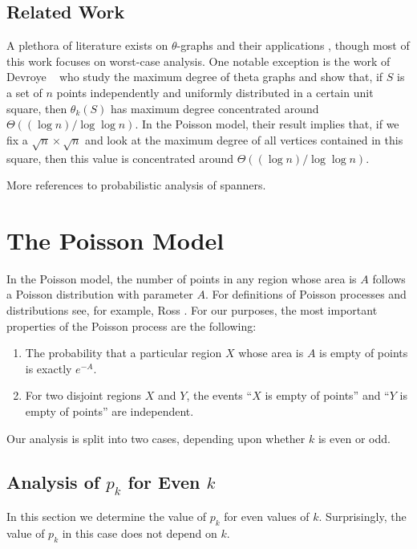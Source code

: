 \documentclass{patmorin}
\begin{document}
\subsection{Related Work}

A plethora of literature exists on $\theta$-graphs \cite{S} and
their applications \cite{S}, though most of this work focuses on
worst-case analysis.  One notable exception is the work of Devroye
\etal\ \cite{dgmXX} who study the maximum degree of theta graphs and
show that, if $S$ is a set of $n$ points independently and uniformly
distributed in a certain unit square, then $\theta_k(S)$ has maximum
degree concentrated around $\Theta((\log n)/\log\log n)$.  In the Poisson
model, their result implies that, if we fix a $\sqrt{n}\times\sqrt{n}$
and look at the maximum degree of all vertices contained in this square,
then this value is concentrated around $\Theta((\log n)/\log\log n)$.

More references to probabilistic analysis of spanners.

\section{The Poisson Model}

In the Poisson model, the number of points in any region whose
area is $A$ follows a Poisson distribution with parameter $A$.  For
definitions of Poisson processes and distributions see, for example,
Ross \cite[Chapter~2]{ross:introduction}.  For our purposes, the most
important properties of the Poisson process are the following:
\begin{enumerate}
\item The probability  that a particular region $X$ whose area is $A$
   is empty of points is exactly $e^{-A}$.
\item For two disjoint regions $X$ and $Y$, the events ``$X$ is empty
   of points'' and ``$Y$ is empty of points'' are independent.
\end{enumerate}
Our analysis is split into two cases, depending upon whether $k$ is even
or odd.


\subsection{Analysis of $p_k$ for Even $k$}

In this section we determine the value of $p_k$ for even values of $k$.
Surprisingly, the value of $p_k$ in this case does not depend on $k$.
\end{document}

